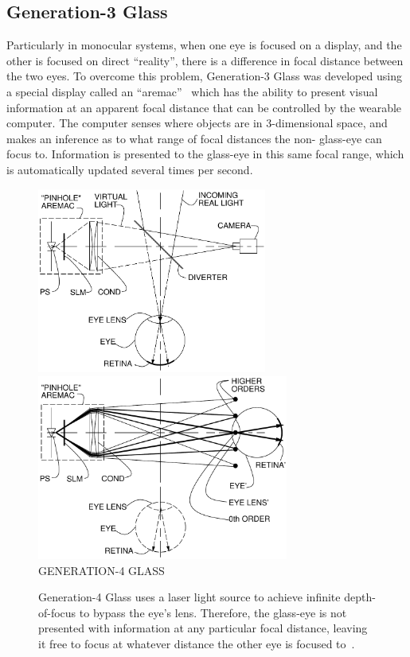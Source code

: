 \subsection{Generation-3 Glass}
Particularly in monocular systems, when one eye is focused on a display, and the other is focused on 
direct
``reality'', there is a difference in focal distance between the two eyes. To overcome this problem, 
Generation-3 Glass was developed using a special display called an 
``aremac''~\cite{mann2001aremac} which has the ability to present visual information at an apparent 
focal distance that can be controlled by the wearable computer. The computer senses where objects 
are in 3-dimensional space, and makes an inference as to what range of focal distances the non-
glass-eye can focus to. Information is presented to the glass-eye in this same focal range, which is 
automatically updated several times per second.

\begin{figure}
  \includegraphics[height=2.4in]{ch6/figs/GlassGen4a.pdf}
  \includegraphics[height=2.4in]{ch6/figs/GlassGen4b.pdf}\\
  {\sffamily \large GENERATION-4 GLASS}\\
  \caption{Generation-4 Glass uses a laser light source to achieve
           infinite depth-of-focus to bypass the eye's lens.  Therefore,
           the glass-eye is not presented with information at any particular
           focal distance, leaving it free to focus at whatever distance the
           other eye is focused to~\cite{mann2013freeglass}.}
  \label{fig:genfour}
\end{figure}

